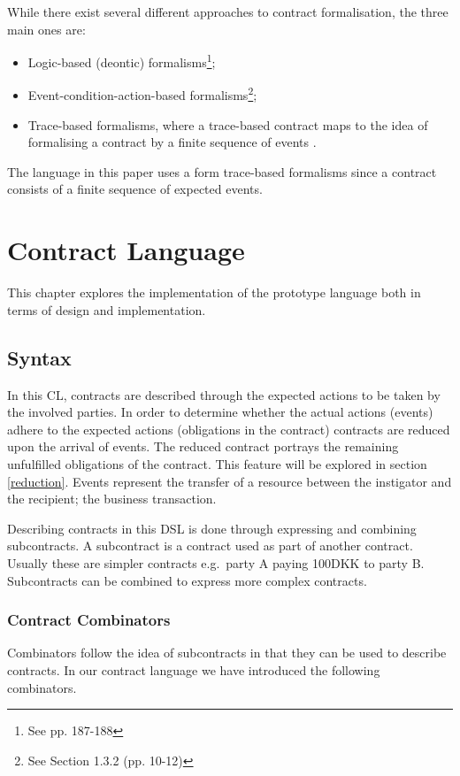 \documentclass{ituthesis}
\begin{document}
While there exist several different approaches to contract formalisation, the three main ones are:
\begin{itemize}
    \item Logic-based (deontic) formalisms\footnote{See \cite{hvitved2011contract} pp. 187-188};
    \item Event-condition-action-based formalisms\footnote{See \cite{hvitved2011contract} Section 1.3.2 (pp. 10-12)};
    \item Trace-based formalisms, where a trace-based contract maps to the idea of formalising a contract by a finite sequence of events \cite{andersen2006compositional}.
\end{itemize}

The language in this paper uses a form trace-based formalisms since a contract consists of a finite sequence of expected events.

\chapter{Contract Language}
This chapter explores the implementation of the prototype language both in terms of design and implementation.

\section{Syntax}\label{language}
In this CL, contracts are described through the expected actions to be taken by the involved parties. In order to determine whether the actual actions (events) adhere to the expected actions (obligations in the contract) contracts are reduced upon the arrival of events. The reduced contract portrays the remaining unfulfilled obligations of the contract. This feature will be explored in section \ref{reduction}. Events represent the transfer of a resource between the instigator and the recipient; the business transaction.

Describing contracts in this DSL is done through expressing and combining subcontracts. A subcontract is a contract used as part of another contract. Usually these are simpler contracts e.g.\ party A paying 100DKK to party B. Subcontracts can be combined to express more complex contracts.
\subsection{Contract Combinators}
\label{combinators}
Combinators follow the idea of subcontracts in that they can be used to describe contracts. In our contract language we have introduced the following combinators.
\end{document}
